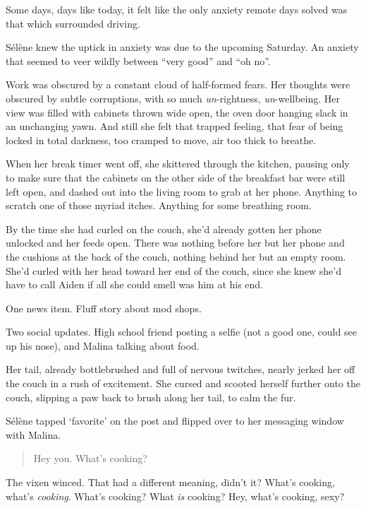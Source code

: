 Some days, days like today, it felt like the only anxiety remote days solved was that which surrounded driving.

Sélène knew the uptick in anxiety was due to the upcoming Saturday. An anxiety that seemed to veer wildly between ``very good'' and ``oh no''.

Work was obscured by a constant cloud of half-formed fears. Her thoughts were obscured by subtle corruptions, with so much \emph{un}-rightness, \emph{un}-wellbeing. Her view was filled with cabinets thrown wide open, the oven door hanging slack in an unchanging yawn. And still she felt that trapped feeling, that fear of being locked in total darkness, too cramped to move, air too thick to breathe.

When her break timer went off, she skittered through the kitchen, pausing only to make sure that the cabinets on the other side of the breakfast bar were still left open, and dashed out into the living room to grab at her phone. Anything to scratch one of those myriad itches. Anything for some breathing room.

By the time she had curled on the couch, she'd already gotten her phone unlocked and her feeds open. There was nothing before her but her phone and the cushions at the back of the couch, nothing behind her but an empty room. She'd curled with her head toward her end of the couch, since she knew she'd have to call Aiden if all she could smell was him at his end.

One news item. Fluff story about mod shops.

Two social updates. High school friend posting a selfie (not a good one, could see up his nose), and Malina talking about food.

Her tail, already bottlebrushed and full of nervous twitches, nearly jerked her off the couch in a rush of excitement. She cursed and scooted herself further onto the couch, slipping a paw back to brush along her tail, to calm the fur.

Sélène tapped `favorite' on the post and flipped over to her messaging window with Malina.

\begin{quote}
Hey you. What's cooking?
\end{quote}

The vixen winced. That had a different meaning, didn't it? What's cooking, what's \emph{cooking}. What's cooking? What \emph{is} cooking? Hey, what's cooking, sexy?


